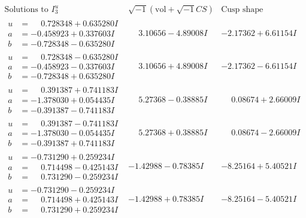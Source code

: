 \documentclass[1p]{elsarticle_modified}
\theoremstyle{definition}
\newcommand{\I}{\sqrt{-1}}
\begin{document}
$$\begin{array}{c|c|c}  
\text{Solutions to }I^u_{3}& \I (\text{vol} + \sqrt{-1}CS) & \text{Cusp shape}\\
 \hline 
\begin{aligned}
u &= \phantom{-}0.728348 + 0.635280 I \\
a &= -0.458923 + 0.337603 I \\
b &= -0.728348 - 0.635280 I\end{aligned}
 & \phantom{-}3.10656 - 4.89008 I & -2.17362 + 6.61154 I \\ \hline\begin{aligned}
u &= \phantom{-}0.728348 - 0.635280 I \\
a &= -0.458923 - 0.337603 I \\
b &= -0.728348 + 0.635280 I\end{aligned}
 & \phantom{-}3.10656 + 4.89008 I & -2.17362 - 6.61154 I \\ \hline\begin{aligned}
u &= \phantom{-}0.391387 + 0.741183 I \\
a &= -1.378030 + 0.054435 I \\
b &= -0.391387 - 0.741183 I\end{aligned}
 & \phantom{-}5.27368 - 0.38885 I & \phantom{-}0.08674 + 2.66009 I \\ \hline\begin{aligned}
u &= \phantom{-}0.391387 - 0.741183 I \\
a &= -1.378030 - 0.054435 I \\
b &= -0.391387 + 0.741183 I\end{aligned}
 & \phantom{-}5.27368 + 0.38885 I & \phantom{-}0.08674 - 2.66009 I \\ \hline\begin{aligned}
u &= -0.731290 + 0.259234 I \\
a &= \phantom{-}0.714498 - 0.425143 I \\
b &= \phantom{-}0.731290 - 0.259234 I\end{aligned}
 & -1.42988 - 0.78385 I & -8.25164 + 5.40521 I \\ \hline\begin{aligned}
u &= -0.731290 - 0.259234 I \\
a &= \phantom{-}0.714498 + 0.425143 I \\
b &= \phantom{-}0.731290 + 0.259234 I\end{aligned}
 & -1.42988 + 0.78385 I & -8.25164 - 5.40521 I \\ \hline\begin{aligned}

\end{aligned}
\end{array}$$
\end{document}
